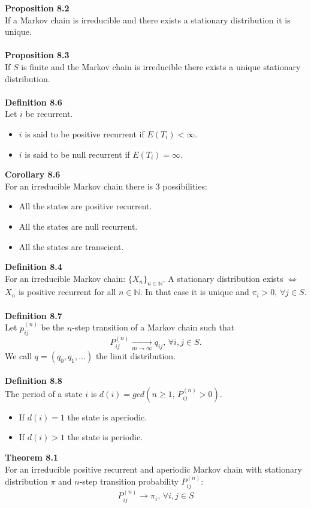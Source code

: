 \documentclass[12pt,a4paper,draft]{report}
\begin{document}
\textbf{Proposition 8.2}\\
If a Markov chain is irreducible and there exists a stationary distribution it is unique.\\\\
\textbf{Proposition 8.3}\\
If $S$ is finite and the Markov chain is irreducible there exists a unique stationary distribution.\\\\
\textbf{Definition 8.6}\\
Let $i$ be recurrent.
\begin{itemize}
\setlength\itemsep{0em}
\item $i$ is said to be positive recurrent if $E(T_i)<\infty$.
\item $i$ is said to be null recurrent if $E(T_i)=\infty$.
\end{itemize}
\textbf{Corollary 8.6}\\
For an irreducible Markov chain there is 3 possibilities:
\begin{itemize}
\setlength\itemsep{0em}
\item All the states are positive recurrent.
\item All the states are null recurrent.
\item All the states are transcient.
\end{itemize}
\textbf{Definition 8.4}\\
For an irreducible Markov chain: $\{X_n\}_{n\in\mathbb{N}}$. A stationary distribution exists $\Leftrightarrow$ $X_n$ is positive recurrent for all $n\in\mathbb{N}$. In that case it is unique and $\pi_i>0,\,\forall j\in S$.\\\\
\textbf{Definition 8.7}\\
Let $p_{ij}^{(n)}$ be the $n$-step transition of a Markov chain such that
\begin{equation}
P_{ij}^{(n)}\underset{m\to\infty}\to q_{ij},\,\forall i,j\in S.
\end{equation}
We call $q=(q_0,q_1,\ldots)$ the limit distribution.\\\\
\textbf{Definition 8.8}\\
The period of a state $i$ is $d(i)=gcd(n\geq1,\,P_{ij}^{(n)}>0)$.
\begin{itemize}
\setlength\itemsep{0em}
\item If $d(i)=1$ the state is aperiodic.
\item If $d(i)>1$ the state is periodic.
\end{itemize}
\textbf{Theorem 8.1}\\
For an irreducible positive recurrent and aperiodic Markov chain with stationary distribution $\pi$ and $n$-step transition probability $P_{ij}^{(n)}$:
\begin{equation}
P_{ij}^{(n)}\to\pi_i,\,\forall i,j\in S
\end{equation}
\end{document}
